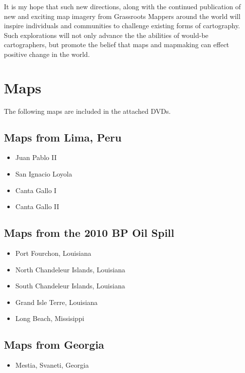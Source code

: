 \documentclass[11pt,oneside,notitlepage]{report}
\begin{document}
{{It is my hope that such new directions, along with the continued publication of new and exciting map imagery from Grassroots Mappers around the world will inspire individuals and communities to challenge existing forms of cartography. Such explorations will not only advance the the abilities of would-be cartographers, but promote the belief that maps and mapmaking can effect positive change in the world.  

\appendix

\chapter{Maps}

The following maps are included in the attached DVDs.

\section{Maps from Lima, Peru}

\begin{itemize}
\item{Juan Pablo II}
\item{San Ignacio Loyola}
\item{Canta Gallo I}
\item{Canta Gallo II}
\end{itemize}

\section{Maps from the 2010 BP Oil Spill}

\begin{itemize}
\item{Port Fourchon, Louisiana}
\item{North Chandeleur Islands, Louisiana}
\item{South Chandeleur Islands, Louisiana}
\item{Grand Isle Terre, Louisiana}
\item{Long Beach, Missisippi}
\end{itemize}

\section{Maps from Georgia}

\begin{itemize}
\item{Mestia, Svaneti, Georgia}
\end{itemize}

}}
\end{document}

